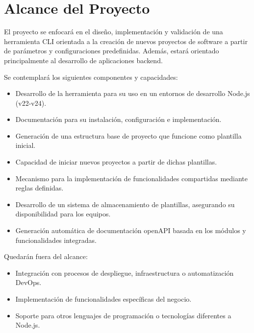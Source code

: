 
\section{Alcance del Proyecto}

El proyecto se enfocará en el diseño, implementación y validación de una herramienta CLI orientada a la creación de nuevos proyectos de software a partir de parámetros y configuraciones predefinidas. Además, estará orientado principalmente al desarrollo de aplicaciones backend.

Se contemplará los siguientes componentes y capacidades:

\begin{itemize}
    \item Desarrollo de la herramienta para su uso en un entornos de desarrollo Node.js (v22-v24).
    \item Documentación para su instalación, configuración e implementación.
    \item Generación de una estructura base de proyecto que funcione como plantilla inicial.
    \item Capacidad de iniciar nuevos proyectos a partir de dichas plantillas.
    \item Mecanismo para la implementación de funcionalidades compartidas mediante reglas definidas.
    \item Desarrollo de un sistema de almacenamiento de plantillas, asegurando su disponibilidad para los equipos.
    \item Generación automática de documentación openAPI basada en los módulos y funcionalidades integradas.
\end{itemize}

Quedarán fuera del alcance:

\begin{itemize}
    \item Integración con procesos de despliegue, infraestructura o automatización DevOps.
    \item Implementación de funcionalidades específicas del negocio.
    \item Soporte para otros lenguajes de programación o tecnologías diferentes a Node.js.
\end{itemize}
